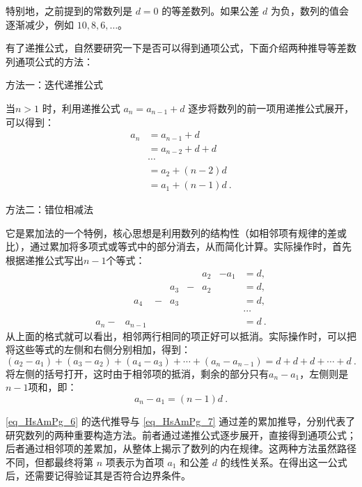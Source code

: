 特别地，之前提到的常数列是 $d = 0$ 的等差数列。如果公差 $d$ 为负，数列的值会逐渐减少，例如 $10, 8, 6, \dots$。

有了递推公式，自然要研究一下是否可以得到通项公式，下面介绍两种推导等差数列通项公式的方法：

方法一：迭代递推公式

当$n>1$ 时，利用递推公式  $a_n = a_{n-1} + d$ 逐步将数列的前一项用递推公式展开，可以得到：
\begin{equation}\label{eq_HsAmPg_6}
\begin{aligned}
a_n &= a_{n-1} + d \\
&= a_{n-2}+d + d\\
&\cdots \\
&= a_2 + (n-2)d\\
&=  a_1 + (n-1)d~.
\end{aligned}
\end{equation}

方法二：错位相减法

它是累加法的一个特例，核心思想是利用数列的结构性（如相邻项有规律的差或比），通过累加将多项式或等式中的部分消去，从而简化计算。实际操作时，首先根据递推公式写出$n-1$个等式：
\begin{equation}\label{eq_HsAmPg_7}
\begin{split}
        &      &  &    & & a_2& -a_1 & = d, \\
        &      & & a_3 & -&a_2&      & = d, \\
        & \ \ \ \ a_4  &- &a_3& &    &      & = d, \\
        &        &    && &    &      &\cdots \\
a_n -   & a_{n-1}&   & & &    &      & = d~.
\end{split}
\end{equation}
从上面的格式就可以看出，相邻两行相同的项正好可以抵消。实际操作时，可以把将这些等式的左侧和右侧分别相加，得到：
\begin{equation}
(a_2 - a_1) + (a_3 - a_2) + (a_4 - a_3) + \cdots + (a_n - a_{n-1}) = d + d +d+ \cdots + d~.
\end{equation}
将左侧的括号打开，这时由于相邻项的抵消，剩余的部分只有$a_n-a_1$，左侧则是$n-1$项和，即：
\begin{equation}\label{eq_HsAmPg_8}
a_n -a_1=(n-1)d~.
\end{equation}

\autoref{eq_HsAmPg_6} 的迭代推导与 \autoref{eq_HsAmPg_7} 通过差的累加推导，分别代表了研究数列的两种重要构造方法。前者通过递推公式逐步展开，直接得到通项公式；后者通过相邻项的差累加，从整体上揭示了数列的内在规律。这两种方法虽然路径不同，但都最终将第  $n $ 项表示为首项 $ a_1$  和公差  $d$  的线性关系。在得出这一公式后，还需要记得验证其是否符合边界条件。

